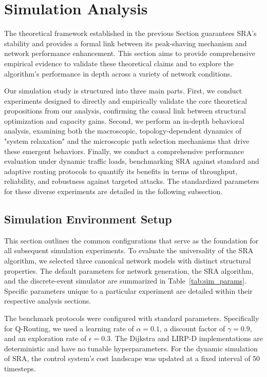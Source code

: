 \documentclass[journal]{IEEEtran}
\begin{document}
\section{Simulation Analysis}
\label{sec:simulation}

The theoretical framework established in the previous Section guarantees SRA's stability and provides a formal link between its peak-shaving mechanism and network performance enhancement. This section aims to provide comprehensive empirical evidence to validate these theoretical claims and to explore the algorithm's performance in depth across a variety of network conditions.

Our simulation study is structured into three main parts. First, we conduct experiments designed to directly and empirically validate the core theoretical propositions from our analysis, confirming the causal link between structural optimization and capacity gains. Second, we perform an in-depth behavioral analysis, examining both the macroscopic, topology-dependent dynamics of "system relaxation" and the microscopic path selection mechanisms that drive these emergent behaviors. Finally, we conduct a comprehensive performance evaluation under dynamic traffic loads, benchmarking SRA against standard and adaptive routing protocols to quantify its benefits in terms of throughput, reliability, and robustness against targeted attacks. The standardized parameters for these diverse experiments are detailed in the following subsection.

\subsection{Simulation Environment Setup}
\label{subsec:sim_setup}

This section outlines the common configurations that serve as the foundation for all subsequent simulation experiments. To evaluate the universality of the SRA algorithm, we selected three canonical network models with distinct structural properties. The default parameters for network generation, the SRA algorithm, and the discrete-event simulator are summarized in Table~\ref{tab:sim_params}. Specific parameters unique to a particular experiment are detailed within their respective analysis sections.

The benchmark protocols were configured with standard parameters. Specifically for Q-Routing, we used a learning rate of $\alpha=0.1$, a discount factor of $\gamma=0.9$, and an exploration rate of $\epsilon=0.3$. The Dijkstra and LIRP-D implementations are deterministic and have no tunable hyperparameters. For the dynamic simulation of SRA, the control system's cost landscape was updated at a fixed interval of 50 timesteps.
\end{document}
